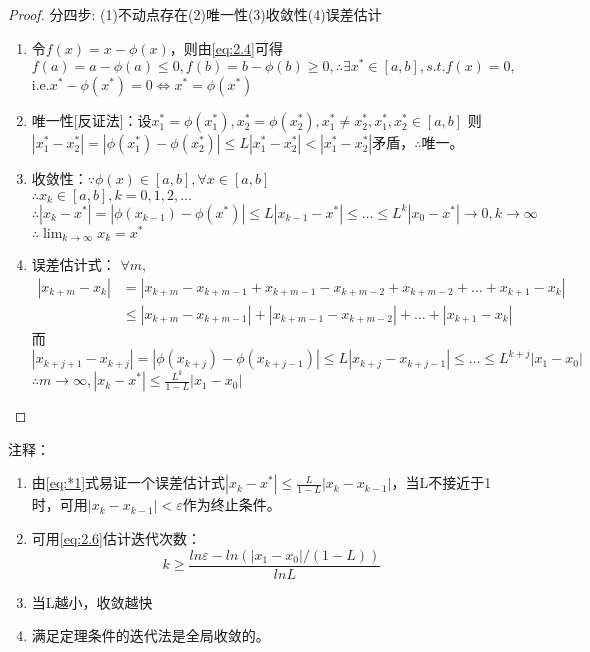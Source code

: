 \documentclass[a4paper]{article}
\begin{document}
\begin{proof}
    分四步: (1)不动点存在(2)唯一性(3)收敛性(4)误差估计

    \begin{enumerate}
        \item 令$f(x)=x-\phi(x)$，则由\ref{eq:2.4}可得$f(a)=a-\phi(a)\le 0, f(b)=b-\phi(b)\ge 0,\therefore \exists x^* \in [a,b], s.t. f(x)=0, $
        i.e.$x^*-\phi(x^*)=0\Leftrightarrow x^*=\phi(x^*)$
        \item 唯一性[反证法]：设$x_1^*=\phi(x_1^*),  x_2^*=\phi(x_2^*), x_1^*\neq x_2^*, x_1^*, x_2^*\in [a,b]$
            则$| x_1^*- x_2^*|=|\phi( x_1^*)-\phi( x_2^*) |\le L| x_1^*- x_2^*|<| x_1^*- x_2^*|$矛盾，$\therefore$唯一。
        \item 收敛性：$\because \phi(x)\in [a,b], \forall x\in [a,b]$\\
        $\therefore x_k\in [a,b], k=0,1,2,\dots$\\
        $\therefore |x_k-x^*|=|\phi(x_{k-1})-\phi(x^*) |\le L|x_{k-1}-x^*|\le \dots \le L^k|x_0-x^*|\rightarrow 0, k\rightarrow \infty$\\
        $\therefore \lim_{k\rightarrow \infty}x_k=x^*$
        \item 误差估计式：
        $\forall m$, 
        \begin{equation}
            \begin{split}
                |x_{k+m}-x_k |&=|x_{k+m}-x_{k+m-1}+x_{k+m-1}-x_{k+m-2}+x_{k+m-2}+\dots+x_{k+1}-x_k | \\
        &\le|x_{k+m}-x_{k+m-1}|+|x_{k+m-1}-x_{k+m-2}|+\dots+|x_{k+1}-x_k |
            \end{split}
            \label{eq:*1}
        \end{equation}
        而$|x_{k+j+1}-x_{k+j} |=|\phi(x_{k+j})-\phi(x_{k+j-1})|\le L|x_{k+j}-x_{k+j-1} |\le \dots \le L^{k+j}|x_1-x_0|$\\
        $\therefore m\rightarrow \infty, |x_k-x^*|\le \frac{L^k}{1-L}|x_1-x_0|$
    \end{enumerate}
\end{proof}

注释：
\begin{enumerate}
    \item 由\ref{eq:*1}式易证一个误差估计式$|x_k-x^*|\le \frac{L}{1-L}|x_k-x_{k-1}|$，当L不接近于1时，可用$|x_k-x_{k-1}|<\varepsilon$作为终止条件。
    \item 可用\ref{eq:2.6}估计迭代次数：
    $$k\ge \frac{ln\varepsilon-ln(|x_1-x_0|/(1-L))}{lnL}$$
    \item 当L越小，收敛越快
    \item 满足定理条件的迭代法是全局收敛的。
\end{enumerate}
\end{document}
